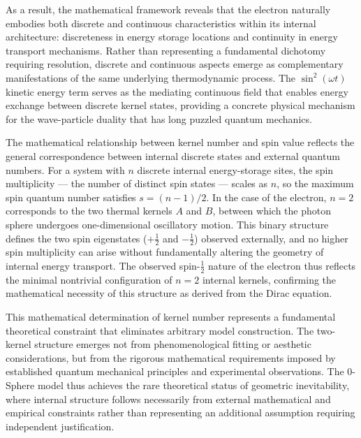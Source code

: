 \documentclass[%
 reprint,
 amsmath,amssymb,
 aps,
]{revtex4-1}
\numberwithin{equation}{section}%
\begin{document}
As a result, the mathematical framework reveals that the electron naturally embodies both discrete and continuous characteristics within its internal architecture: discreteness in energy storage locations and continuity in energy transport mechanisms. Rather than representing a fundamental dichotomy requiring resolution, discrete and continuous aspects emerge as complementary manifestations of the same underlying thermodynamic process. The $\sin^2(\omega t)$ kinetic energy term serves as the mediating continuous field that enables energy exchange between discrete kernel states, providing a concrete physical mechanism for the wave-particle duality that has long puzzled quantum mechanics.

The mathematical relationship between kernel number and spin value reflects the general correspondence between internal discrete states and external quantum numbers. For a system with $n$ discrete internal energy-storage sites, the spin multiplicity — the number of distinct spin states — scales as $n$, so the maximum spin quantum number satisfies $s = (n-1)/2$. In the case of the electron, $n = 2$ corresponds to the two thermal kernels $A$ and $B$, between which the photon sphere undergoes one-dimensional oscillatory motion. This binary structure defines the two spin eigenstates ($+\frac{1}{2}$ and $-\frac{1}{2}$) observed externally, and no higher spin multiplicity can arise without fundamentally altering the geometry of internal energy transport. The observed spin-$\frac{1}{2}$ nature of the electron thus reflects the minimal nontrivial configuration of $n = 2$ internal kernels, confirming the mathematical necessity of this structure as derived from the Dirac equation.

This mathematical determination of kernel number represents a fundamental theoretical constraint that eliminates arbitrary model construction. The two-kernel structure emerges not from phenomenological fitting or aesthetic considerations, but from the rigorous mathematical requirements imposed by established quantum mechanical principles and experimental observations. The 0-Sphere model thus achieves the rare theoretical status of geometric inevitability, where internal structure follows necessarily from external mathematical and empirical constraints rather than representing an additional assumption requiring independent justification.



\clearpage
\end{document}
